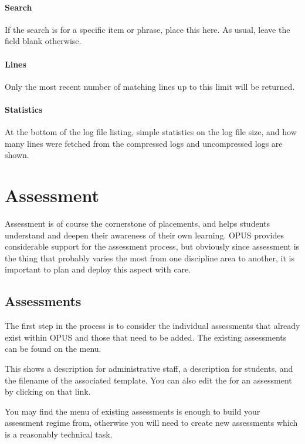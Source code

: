 \documentclass[12 pt]{book}
\begin{document}
\subsubsection{Search}

If the search is for a specific item or phrase, place this here. As usual, leave the field blank otherwise.

\subsubsection{Lines}

Only the most recent number of matching lines up to this limit will be returned.

\subsubsection{Statistics}

At the bottom of the log file listing, simple statistics on the log file size, and how many lines were fetched from the compressed logs and uncompressed logs are shown.


%
%
%

\chapter{Assessment}

Assessment is of course the cornerstone of placements, and helps students
understand and deepen their awareness of their own learning. OPUS 
provides considerable support for the assessment process, but obviously
since assessment is the thing that probably varies the most from one
discipline area to another, it is important to plan and deploy this
aspect with care.

\section{Assessments}

The first step in the process is to consider the individual assessments
that already exist within OPUS and those that need to be added. The
existing assessments can be found on the 
 menu.

This shows a description for administrative staff, a description for
students, and the filename of the associated template. You can also
edit the  for an assessment by clicking on that link.

You may find the menu of existing assessments is enough to build your
assessment regime from, otherwise you will need to create new assessments
which is a reasonably technical task.
\end{document}
